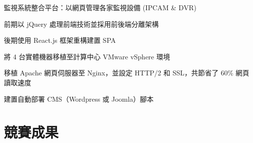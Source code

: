 \documentclass[]{deedy-resume-openfont-ch}
\begin{document}
\begin{minipage}[t]{0.45\textwidth}
\begin{tightemize}
    \item 監視系統整合平台：以網頁管理各家監視設備 (IPCAM \& DVR)
    \item 前期以 jQuery 處理前端技術並採用前後端分離架構
    \item 後期使用 React.js 框架重構建置 SPA
\end{tightemize}

\begin{tightemize}
    \item 將 4 台實體機器移植至計算中心 VMware vSphere 環境
    \item 移植 Apache 網頁伺服器至 Nginx，並設定 HTTP/2 和 SSL，共節省了 60\% 網頁讀取速度
    \item 建置自動部署 CMS（Wordpress 或 Joomla）腳本
\end{tightemize}
\sectionsep


\section{競賽成果}


\sectionsep

%
%

\end{minipage}
\hfill
\end{document}
